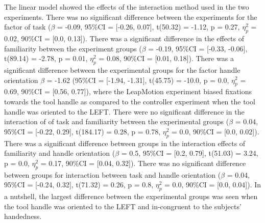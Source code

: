 The linear model showed the effects of the interaction method used in the two experiments. There was no significant difference between the experiments for the factor of task ($\beta$ = -0.09, 95\%CI = [-0.26, 0.07], t(50.32) = -1.12, p = 0.27, $\eta_p^2$ = 0.02, 90\%CI = [0.0, 0.13]). There was a significant difference in the effects of familiarity between the experiment groups ($\beta$ = -0.19, 95\%CI = [-0.33, -0.06], t(89.14) = -2.78, p = 0.01, $\eta_p^2$ = 0.08, 90\%CI = [0.01, 0.18]). There was a significant difference between the experimental groups for the factor handle orientation $\beta$ = -1.62 (95\%CI = [-1.94, -1.31], t(45.75) = -10.0, p = 0.0, $\eta_p^2$ = 0.69, 90\%CI = [0.56, 0.77]), where the LeapMotion experiment biased fixations towards the tool handle as compared to the controller experiment when the tool handle was oriented to the LEFT. There were no significant difference in the interaction of of task and familiarity between the experimental groups ($\beta$ = 0.04, 95\%CI = [-0.22, 0.29], t(184.17) = 0.28, p = 0.78, $\eta_p^2$ = 0.0, 90\%CI = [0.0, 0.02]). There was a significant difference between groups in the interaction effects of familiarity and handle orientation ($\beta$ = 0.5, 95\%CI = [0.2, 0.79], t(51.03) = 3.24, p = 0.0, $\eta_p^2$ = 0.17, 90\%CI = [0.04, 0.32]). There was no significant difference between groups for interaction between task and handle orientation ($\beta$ = 0.04, 95\%CI = [-0.24, 0.32], t(71.32) = 0.26, p = 0.8, $\eta_p^2$ = 0.0, 90\%CI = [0.0, 0.04]). In a nutshell, the largest difference between the experimental groups was seen when the tool handle was oriented to the LEFT and in-congruent to the subjects' handedness.


